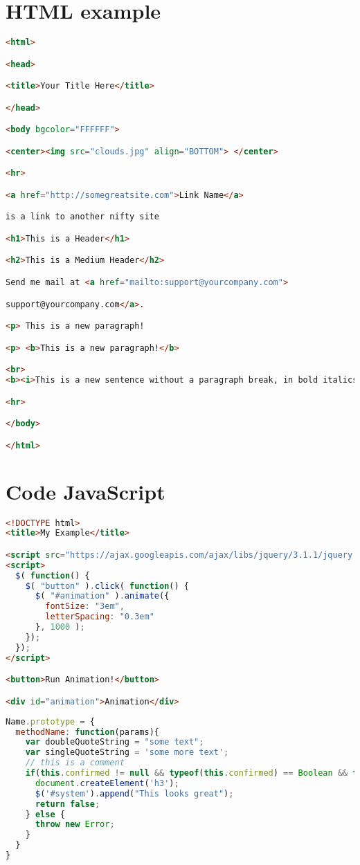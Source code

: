 \section{HTML example}
\begin{lstlisting}[language=HTML]
<html>

<head>

<title>Your Title Here</title>

</head>

<body bgcolor="FFFFFF">

<center><img src="clouds.jpg" align="BOTTOM"> </center>

<hr>

<a href="http://somegreatsite.com">Link Name</a>

is a link to another nifty site

<h1>This is a Header</h1>

<h2>This is a Medium Header</h2>

Send me mail at <a href="mailto:support@yourcompany.com">

support@yourcompany.com</a>.

<p> This is a new paragraph!

<p> <b>This is a new paragraph!</b>

<br> 
<b><i>This is a new sentence without a paragraph break, in bold italics.</i></b>

<hr>

</body>

</html> 

\end{lstlisting}
\section{Code JavaScript}
\begin{lstlisting}[language=HTML,numbers=none]
<!DOCTYPE html>
<title>My Example</title>

<script src="https://ajax.googleapis.com/ajax/libs/jquery/3.1.1/jquery.min.js"></script>
<script>
  $( function() {
    $( "button" ).click( function() {
      $( "#animation" ).animate({
        fontSize: "3em",
        letterSpacing: "0.3em"
      }, 1000 );   
    });
  });
</script>

<button>Run Animation!</button>

<div id="animation">Animation</div>

\end{lstlisting}

\begin{lstlisting}[language=JavaScript]
Name.prototype = {
  methodName: function(params){
    var doubleQuoteString = "some text";
    var singleQuoteString = 'some more text';
    // this is a comment
    if(this.confirmed != null && typeof(this.confirmed) == Boolean && this.confirmed == true){
      document.createElement('h3');
      $('#system').append("This looks great");
      return false;
    } else {
      throw new Error;
    }
  }
}
\end{lstlisting}
\clearpage
